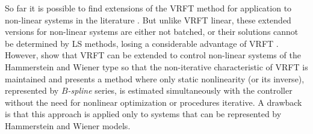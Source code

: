 	So far it is possible to find extensions of the VRFT method for application to non-linear systems in the literature \citep{previdi2004a, campi2006, wang2011a, bazanella2014a, yan2016a, radac2018b}.
	But unlike VRFT linear, these extended versions for non-linear systems are either not batched, or their solutions cannot be determined by LS methods, losing a considerable advantage of VRFT \citep{jeng2018a}.
	However, \cite{jeng2015a} show that VRFT can be extended to control non-linear systems of the Hammerstein and Wiener type so that the non-iterative characteristic of VRFT is maintained and presents a method where only static nonlinearity (or its inverse), represented by $B$\emph{-spline} series, is estimated simultaneously with the controller without the need for nonlinear optimization or procedures iterative. 
	A drawback is that this approach is applied only to systems that can be represented by Hammerstein and Wiener models.

